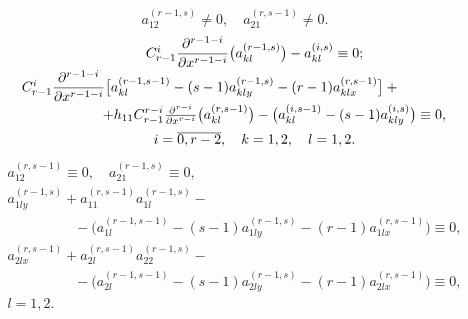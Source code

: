 \begin{equation}
a_{12}^{(r-1,s)}\neq0,\quad a_{21}^{(r,s-1)}\neq0.
\label{soz:eq31}
\end{equation}
\begin{equation}
\label{soz:eq32}
\begin{array}{c}
C_{r-1}^{i}\dfrac{\partial^{r-1-i}}{\partial x^{r-1-i}}
\bigl(a_{kl}^{(r-1,s)}\bigr)-a_{kl}^{(i,s)}\equiv0;
\\[2mm]
C_{r-1}^{i}\dfrac{\partial^{r-1-i}}{\partial x^{r-1-i}}
\bigl[a_{kl}^{(r-1,s-1)}-(s-1)a_{kly}^{(r-1,s)}-(r-1)a_{klx}^{(r,s-1)}\bigr]+\hspace{2cm}\phantom{1} \\[2mm]
\hspace{1cm}+h_{11}C_{r-1}^{r-i}\frac{\partial^{r-i}}{\partial x^{r-i}}
\bigl(a_{kl}^{(r,s-1)}\bigr)- \bigl(a_{kl}^{(i,s-1)}-(s-1)a_{kly}^{(i,s)}\bigr)\equiv0,\\[2mm] 
i=\overline{0,r-2},\quad  k=1, 2,\quad  l=1, 2.
\end{array}\hspace{-1cm}
\end{equation}
\begin{equation}
\begin{array}{c}
a_{12}^{(r,s-1)}\equiv0,\quad  a_{21}^{(r-1,s)}\equiv0,\\
[2mm]
a_{1ly}^{(r-1,s)}+a_{11}^{(r,s-1)}a_{1l}^{(r-1,s)}- \hspace{6cm}\phantom{1}
\\[2mm]
\hspace{2cm}
-\bigl(a_{1l}^{(r-1,s-1)}-(s-1)a_{1ly}^{(r-1,s)}-(r-1)a_{1lx}^{(r,s-1)} \bigr)\equiv0,\\[2mm]
a_{2lx}^{(r,s-1)}+a_{2l}^{(r,s-1)}a_{22}^{(r-1,s)}- \hspace{6cm}\phantom{1}
\\[2mm]
\hspace{2cm}- \bigl(a_{2l}^{(r-1,s-1)}-(s-1)a_{2ly}^{(r-1,s)}-(r-1)a_{2lx}^{(r,s-1)} \bigr)\equiv0,
\\[2mm]
 l=1, 2.
\end{array}
\label{soz:eq33}
\end{equation}
